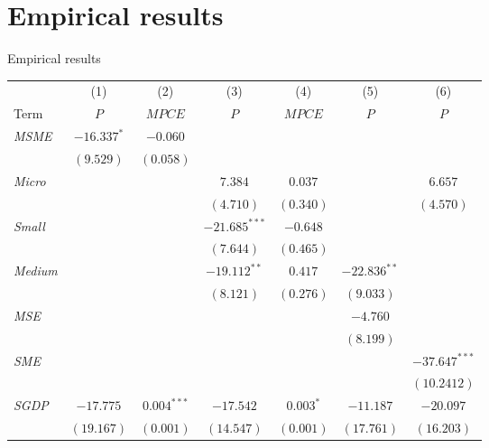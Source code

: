 \documentclass[10pt,aspectratio=169]{beamer}
\begin{document}
\section{Empirical results}

\begin{frame}{Empirical results}

\begin{table}[htbp]
    \centering
    \scriptsize
    \setlength{\tabcolsep}{4pt}
    \renewcommand{\arraystretch}{0.85} %
    \begin{threeparttable}
        \begin{tabular}{lcccccc}
            \toprule
            \toprule
            & (1) & (2) & (3) & (4) & (5) & (6) \\
            Term & \(P\) & \(MPCE\) & \(P\) & \(MPCE\) & \(P\) & \(P\) \\
            \midrule
            \textit{MSME} & $-16.337^{*}$ & $-0.060$ & & & & \\
            & $(9.529)$ & $(0.058)$ & & & & \\
                   
            \textit{Micro} & & & $7.384$ & $0.037$ & & $6.657$ \\
            & & & $(4.710)$ & $(0.340)$ & & $(4.570)$ \\
                   
            \textit{Small} & & & $-21.685^{***}$ & $-0.648$ & & \\
            & & & $(7.644)$ & $(0.465)$ & & \\
                   
            \textit{Medium} & & & $-19.112^{**}$ & $0.417$ & $-22.836^{**}$ & \\
            & & & $(8.121)$ & $(0.276)$ & $(9.033)$ & \\
                    
            \textit{MSE} & & & & & $-4.760$ &  \\
            & & & & & $(8.199)$ &  \\
                 
            \textit{SME} & & & & & & $-37.647^{***}$ \\
            & & & & & & $(10.2412)$\\
                      
            \textit{SGDP} & $-17.775$ & $0.004^{***}$ & $-17.542$ & $0.003^{*}$ & $-11.187$ & $-20.097$ \\
            & $(19.167)$ & $(0.001)$ & $(14.547)$ & $(0.001)$ & $(17.761)$ & $(16.203)$ \\
                  

\end{tabular}
\end{threeparttable}
\end{table}
\end{frame}
\end{document}

